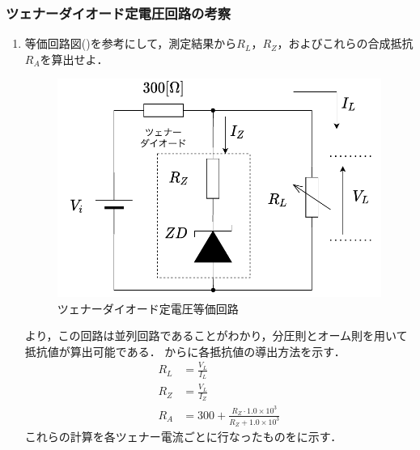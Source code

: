 \clearpage
\subsubsection{ツェナーダイオード定電圧回路の考察}
\begin{enumerate}[(1)]
	\item 等価回路図()を参考にして，測定結果から$R_{L}$，$R_{Z}$，およびこれらの合成抵抗$R_{A}$を算出せよ．
	
	\begin{figure}[h]
	\centering
	\includegraphics[scale=0.75]{./fig/zener-eq.pdf}
	\caption{ツェナーダイオード定電圧等価回路}
	\label{fig:zener-eq}
	\end{figure}
	より，この回路は並列回路であることがわかり，分圧則とオーム則を用いて抵抗値が算出可能である．
	からに各抵抗値の導出方法を示す．
\begin{align}
	R_{L}&=\frac{V_{L}}{I_{L}}\label{eq:RL}\\
	R_{Z}&=\frac{V_{L}}{I_{Z}}\label{eq:RZ}\\
	R_{A}&=300+\frac{R_{Z}\cdot 1.0\times 10^{3}}{R_{Z}+1.0\times 10^{3}}\label{eq:RA}
\end{align}
	これらの計算を各ツェナー電流ごとに行なったものをに示す．
	

\end{enumerate}
